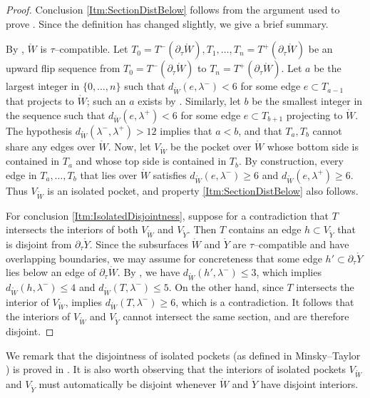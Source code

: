 \documentclass[11pt,letterpaper]{amsart}
\newcommand{\mr}{\mathring}
\newcommand{\bdy}{\partial} %
\newcommand{\psub}{\mr W}
\numberwithin{equation}{section}
\theoremstyle{definition}
\begin{document}
\begin{proof}
Conclusion \eqref{Itm:SectionDistBelow} follows from the argument used to prove \cite[Lemma 6.4]{MinskyTaylor:FiberedFaces}. Since the definition has changed slightly, we give a brief summary. 

By , $\psub$ is $\tau$--compatible.
Let $T_0 = T^-(\bdy_\tau \psub), T_1, \ldots, T_n = T^+(\bdy_\tau \psub)$ be an upward flip sequence from $T_0 = T^-(\bdy_\tau \psub)$ to $T_n = T^+(\bdy_\tau \psub)$. 
Let $a$ be the largest integer in $\{0, \ldots, n\}$  such that $d_{\psub}(e, \lambda^-) < 6$ for some edge $e \subset T_{a-1}$ that projects to $\psub$; such an $a$ exists by . Similarly, let $b$ be the smallest integer in the sequence such that $d_{\psub}(e, \lambda^+) < 6$ for some edge $e \subset T_{b+1}$ projecting to $\psub$. The hypothesis $d_{\psub}(\lambda^-, \lambda^+) > 12$ implies that $a < b$, and that $T_a, T_b$ cannot share any edges over $\psub$.
%
Now, let $V_{\psub}$ be the pocket over $\psub$ whose bottom side is contained in $T_a$ and whose top side is contained in $T_b$. 
By construction, every edge in $T_a, \ldots, T_b$ that lies over $\psub$ satisfies $d_{\psub}(e, \lambda^-) \geq 6$ and  $d_{\psub}(e, \lambda^+) \geq 6$. Thus $V_{\psub}$ is an isolated pocket, and property \eqref{Itm:SectionDistBelow} also follows.

For conclusion \eqref{Itm:IsolatedDisjointness}, suppose for a contradiction that $T$ intersects the interiors of both $V_{\psub}$ and $V_{\mr Y}$. 
Then $T$ contains an edge $h \subset V_{\mr Y}$ that is disjoint from $\bdy_\tau  {\mr Y}$. Since the subsurfaces $\psub$ and ${\mr Y}$ are $\tau$--compatible and have overlapping boundaries, we may assume for concreteness that
 some edge $h' \subset \bdy_\tau {\mr Y}$ lies below an edge of $\bdy_\tau \psub$. By , we have $d_{\psub}(h', \lambda^-) \leq 3$, which implies $d_{\psub}(h, \lambda^-) \leq 4$ and $d_{\psub}(T, \lambda^-) \leq 5$. On the other hand, since $T$ intersects the interior of $V_{\psub}$,  implies $d_{\psub}(T, \lambda^-) \geq 6$, which is a contradiction. It follows that the interiors of $V_{\psub}$ and $V_{\mr Y}$ cannot intersect the same section, and are therefore disjoint.
\end{proof}

We remark that the disjointness of isolated pockets (as defined in Minsky--Taylor \cite[Section 6.3]{MinskyTaylor:FiberedFaces}) is proved in \cite[Proposition 6.5]{MinskyTaylor:FiberedFaces}. It is also worth observing that 
the interiors of isolated pockets $V_{\psub}$ and $V_{\mr Y}$ must automatically be disjoint whenever $\psub$ and ${\mr Y}$ have disjoint interiors.
\end{document}
